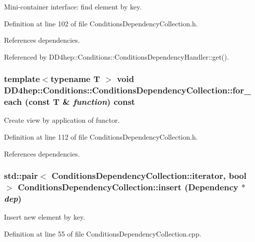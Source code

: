 Mini-\/container interface: find element by key. 

Definition at line 102 of file ConditionsDependencyCollection.h.

References dependencies.

Referenced by DD4hep::Conditions::ConditionsDependencyHandler::get().\hypertarget{class_d_d4hep_1_1_conditions_1_1_conditions_dependency_collection_a3836e72b17bbaab6559f4f633e185ddd}{
\subsubsection[{for\_\-each}]{\setlength{\rightskip}{0pt plus 5cm}template$<$typename T $>$ void DD4hep::Conditions::ConditionsDependencyCollection::for\_\-each (const {\bf T} \& {\em function}) const}}
\label{class_d_d4hep_1_1_conditions_1_1_conditions_dependency_collection_a3836e72b17bbaab6559f4f633e185ddd}


Create view by application of functor. 

Definition at line 112 of file ConditionsDependencyCollection.h.

References dependencies.\hypertarget{class_d_d4hep_1_1_conditions_1_1_conditions_dependency_collection_a2f8d2a2f72821fbf0c223f24b9b074af}{
\subsubsection[{insert}]{\setlength{\rightskip}{0pt plus 5cm}std::pair$<$ {\bf ConditionsDependencyCollection::iterator}, bool $>$ ConditionsDependencyCollection::insert ({\bf Dependency} $\ast$ {\em dep})}}
\label{class_d_d4hep_1_1_conditions_1_1_conditions_dependency_collection_a2f8d2a2f72821fbf0c223f24b9b074af}


Insert new element by key. 

Definition at line 55 of file ConditionsDependencyCollection.cpp.

